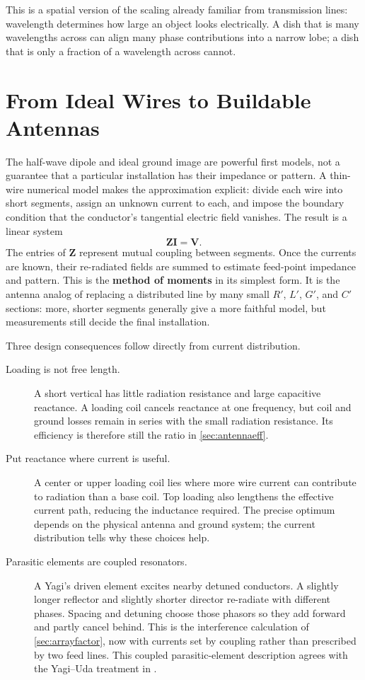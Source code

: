 This is a spatial version of the scaling already familiar from transmission
lines: wavelength determines how large an object looks electrically.  A dish
that is many wavelengths across can align many phase contributions into a narrow
lobe; a dish that is only a fraction of a wavelength across cannot.

\section{From Ideal Wires to Buildable Antennas}
The half-wave dipole and ideal ground image are powerful first models, not a
guarantee that a particular installation has their impedance or pattern.  A
thin-wire numerical model makes the approximation explicit: divide each wire
into short segments, assign an unknown current to each, and impose the boundary
condition that the conductor's tangential electric field vanishes.  The result is
a linear system
\[
\mathbf Z\mathbf I=\mathbf V.
\]
The entries of \(\mathbf Z\) represent mutual coupling between segments.  Once
the currents are known, their re-radiated fields are summed to estimate feed-point
impedance and pattern.  This is the \textbf{method of moments} in its simplest
form.  It is the antenna analog of replacing a distributed line by many small
\(R'\), \(L'\), \(G'\), and \(C'\) sections: more, shorter segments generally
give a more faithful model, but measurements still decide the final installation.

Three design consequences follow directly from current distribution.
\begin{description}
\item[Loading is not free length.] A short vertical has little radiation
resistance and large capacitive reactance.  A loading coil cancels reactance at one
frequency, but coil and ground losses remain in series with the small radiation
resistance.  Its efficiency is therefore still the ratio in \cref{sec:antennaeff}.
\item[Put reactance where current is useful.] A center or upper loading coil lies
where more wire current can contribute to radiation than a base coil.  Top loading
also lengthens the effective current path, reducing the inductance required.  The
precise optimum depends on the physical antenna and ground system; the current
distribution tells why these choices help.
\item[Parasitic elements are coupled resonators.] A Yagi's driven element excites
nearby detuned conductors.  A slightly longer reflector and slightly shorter director
re-radiate with different phases.  Spacing and detuning choose those phasors so they
add forward and partly cancel behind. This is the interference calculation of
\cref{sec:arrayfactor}, now with currents set by coupling rather than prescribed by
two feed lines.
This coupled parasitic-element description agrees with the Yagi--Uda treatment in
\cite[pp.~378--385]{free2022rfmicrowave}.
\end{description}

